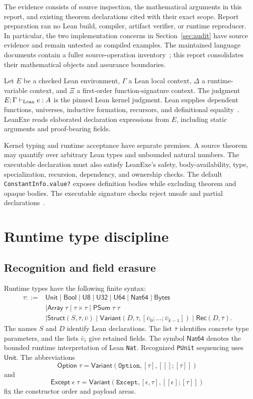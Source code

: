 \documentclass[11pt]{article}
\newcommand{\code}[1]{\texttt{#1}}
\newcommand{\ty}[1]{\mathsf{#1}}
\begin{document}
The evidence consists of source inspection, the mathematical arguments in this report, and existing theorem declarations cited with their exact scope.  Report preparation ran no Lean build, compiler, artifact verifier, or runtime reproducer.  In particular, the two implementation concerns in Section~\ref{sec:audit} have source evidence and remain untested as compiled examples.  The maintained language documents contain a fuller source-operation inventory~\cite{typetheory,specification}; this report consolidates their mathematical objects and assurance boundaries.

Let $E$ be a checked Lean environment, $\Gamma$ a Lean local context, $\Delta$ a runtime-variable context, and $\Xi$ a first-order function-signature context.  The judgment $E;\Gamma\vdash_{\rm Lean} e:A$ is the pinned Lean kernel judgment.  Lean supplies dependent functions, universes, inductive formation, recursors, and definitional equality~\cite{lean}.  LeanExe reads elaborated declaration expressions from $E$, including static arguments and proof-bearing fields.

Kernel typing and runtime acceptance have separate premises.  A source theorem may quantify over arbitrary Lean types and unbounded natural numbers.  The executable declaration must also satisfy LeanExe's safety, body-availability, type, specialization, recursion, dependency, and ownership checks.  The default \code{ConstantInfo.value?} exposes definition bodies while excluding theorem and opaque bodies.  The executable signature checks reject unsafe and partial declarations~\cite{types,extract}.

\section{Runtime type discipline}

\subsection{Recognition and field erasure}

Runtime types have the following finite syntax:
\begin{align*}
\tau ::= {}&\ty{Unit}\mid\ty{Bool}\mid\ty{U8}\mid\ty{U32}\mid\ty{U64}
       \mid\ty{Nat64}\mid\ty{Bytes}\\
 &\mid\ty{Array}\;\tau\mid\tau\times\tau\mid\ty{PSum}\;\tau\;\tau\\
 &\mid\ty{Struct}(S,\bar\tau,\bar\upsilon)
  \mid\ty{Variant}(D,\bar\tau,[\bar\upsilon_0;\ldots;\bar\upsilon_{k-1}])
  \mid\ty{Rec}(D,\bar\tau).
\end{align*}
The names $S$ and $D$ identify Lean declarations.  The list $\bar\tau$ identifies concrete type parameters, and the lists $\bar\upsilon_i$ give retained fields.  The symbol $\ty{Nat64}$ denotes the bounded runtime interpretation of Lean \code{Nat}.  Recognized \code{PUnit} sequencing uses $\ty{Unit}$.  The abbreviations
\[
\ty{Option}\;\tau=\ty{Variant}(\code{Option},[\tau],[[];[\tau]])
\]
and
\[
\ty{Except}\;\epsilon\;\tau
=\ty{Variant}(\code{Except},[\epsilon,\tau],[[\epsilon];[\tau]])
\]
fix the constructor order and payload areas.
\end{document}
